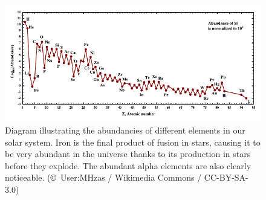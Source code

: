 \documentclass[english, oneside]{HYgradu}
\begin{document}
\begin{figure}
\centering
\includegraphics[width=\textwidth]{../images/SolarSystemAbundances.pdf}
\caption{Diagram illustrating the abundancies of different elements in our solar system. Iron is the final product of fusion in stars, causing it to be very abundant in the universe thanks to its production in stars before they explode. The abundant alpha elements are also clearly noticeable.
(\copyright \ User:MHz\textasciigrave as / Wikimedia Commons / CC-BY-SA-3.0)}
\label{fig:IronPeak}
\end{figure}
\end{document}
